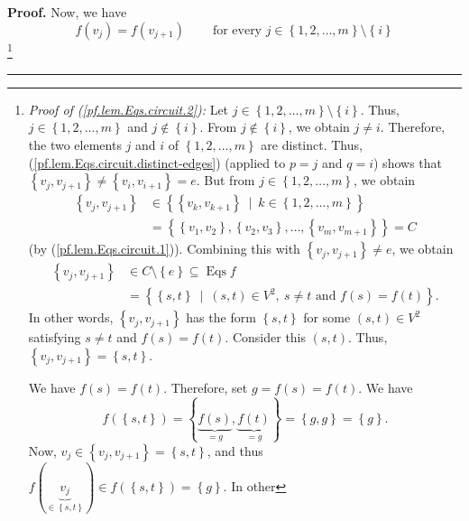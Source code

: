 \documentclass[numbers=enddot,12pt,final,onecolumn,notitlepage]{scrartcl}%
\theoremstyle{definition}
\newenvironment{proof}[1][Proof]{\noindent\textbf{#1.} }{\ \rule{0.5em}{0.5em}}
\newenvironment{verlong}{}{}
\begin{document}
\begin{verlong}
\begin{proof}
Now, we have%
\begin{equation}
f\left(  v_{j}\right)  =f\left(  v_{j+1}\right)  \ \ \ \ \ \ \ \ \ \ \text{for
every }j\in\left\{  1,2,\ldots,m\right\}  \setminus\left\{  i\right\}
\label{pf.lem.Eqs.circuit.2}%
\end{equation}
\footnote{\textit{Proof of (\ref{pf.lem.Eqs.circuit.2}):} Let $j\in\left\{
1,2,\ldots,m\right\}  \setminus\left\{  i\right\}  $. Thus, $j\in\left\{
1,2,\ldots,m\right\}  $ and $j\notin\left\{  i\right\}  $. From $j\notin%
\left\{  i\right\}  $, we obtain $j\neq i$. Therefore, the two elements $j$
and $i$ of $\left\{  1,2,\ldots,m\right\}  $ are distinct. Thus,
(\ref{pf.lem.Eqs.circuit.distinct-edges}) (applied to $p=j$ and $q=i$) shows
that $\left\{  v_{j},v_{j+1}\right\}  \neq\left\{  v_{i},v_{i+1}\right\}  =e$.
But from $j\in\left\{  1,2,\ldots,m\right\}  $, we obtain%
\begin{align*}
\left\{  v_{j},v_{j+1}\right\}   &  \in\left\{  \left\{  v_{k},v_{k+1}%
\right\}  \ \mid\ k\in\left\{  1,2,\ldots,m\right\}  \right\} \\
&  =\left\{  \left\{  v_{1},v_{2}\right\}  ,\left\{  v_{2},v_{3}\right\}
,\ldots,\left\{  v_{m},v_{m+1}\right\}  \right\}  =C
\end{align*}
(by (\ref{pf.lem.Eqs.circuit.1})). Combining this with $\left\{  v_{j}%
,v_{j+1}\right\}  \neq e$, we obtain%
\begin{align*}
\left\{  v_{j},v_{j+1}\right\}   &  \in C\setminus\left\{  e\right\}
\subseteq\operatorname*{Eqs}f\\
&  =\left\{  \left\{  s,t\right\}  \ \mid\ \left(  s,t\right)  \in
V^{2},\ s\neq t\text{ and }f\left(  s\right)  =f\left(  t\right)  \right\}  .
\end{align*}
In other words, $\left\{  v_{j},v_{j+1}\right\}  $ has the form $\left\{
s,t\right\}  $ for some $\left(  s,t\right)  \in V^{2}$ satisfying $s\neq t$
and $f\left(  s\right)  =f\left(  t\right)  $. Consider this $\left(
s,t\right)  $. Thus, $\left\{  v_{j},v_{j+1}\right\}  =\left\{  s,t\right\}
$.
\par
We have $f\left(  s\right)  =f\left(  t\right)  $. Therefore, set $g=f\left(
s\right)  =f\left(  t\right)  $. We have%
\[
f\left(  \left\{  s,t\right\}  \right)  =\left\{  \underbrace{f\left(
s\right)  }_{=g},\underbrace{f\left(  t\right)  }_{=g}\right\}  =\left\{
g,g\right\}  =\left\{  g\right\}  .
\]
Now, $v_{j}\in\left\{  v_{j},v_{j+1}\right\}  =\left\{  s,t\right\}  $, and
thus $f\left(  \underbrace{v_{j}}_{\in\left\{  s,t\right\}  }\right)  \in
f\left(  \left\{  s,t\right\}  \right)  =\left\{  g\right\}  $. In other
}
\end{proof}
\end{verlong}
\end{document}
